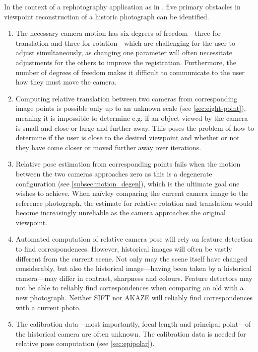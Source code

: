 In the context of a rephotography application as in \citep{bae2010}, five
primary obstacles in viewpoint reconstruction of a historic photograph can be
identified.
\begin{enumerate}
   \item The necessary camera motion has six degrees of freedom---three for
      translation and three for rotation---which are challenging for the user
      to adjust simultaneously, as changing one parameter will often necessitate
      adjustments for the others to improve the registration. Furthermore, the
      number of degrees of freedom makes it difficult to communicate to the
      user how they must move the camera.
   \item Computing relative translation between two cameras from corresponding
      image points is possible only up to an unknown scale (see
      \autoref{sec:eight-point}), meaning it is impossible to
      determine e.g. if an object viewed by the camera is small and close or
      large and further away. This poses the problem of how to determine if the
      user is close to the desired viewpoint and whether or not they have come
      closer or moved further away over iterations. 
   \item Relative pose estimation from corresponding points fails when the
      motion between the two cameras approaches zero as this is a degenerate
      configuration (see \autoref{subsec:motion_degen}), which is the ultimate goal
      one wishes to achieve. When na\"ivley comparing the current camera image
      to the reference photograph, the estimate for relative rotation and
      translation would become increasingly unreliable as the camera approaches the
      original viewpoint.
   \item Automated computation of relative camera pose will rely on feature
      detection to find correspondences. However, historical images will often
      be vastly different from the current scene. Not only may the scene itself
      have changed considerably, but also the historical image---having been
      taken by a historical camera---may differ in contrast, sharpness and
      colours. Feature detectors may not be able to reliably find
      correspondences when comparing an old with a new photograph. Neither SIFT
      nor AKAZE will reliably find correspondences with a current photo.
   \item The calibration data---most importantly, focal length and principal
      point---of the historical camera are often unknown. The calibration data
      is needed for relative pose computation (see \autoref{sec:epipolar}).
\end{enumerate}

